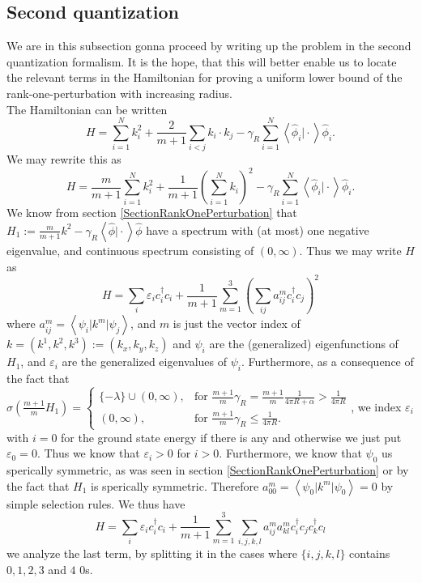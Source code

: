 \documentclass[a4paper,11pt]{article}
\renewcommand{\braket}[1]{\left\langle#1\right\rangle}
\numberwithin{equation}{section}
\begin{document}
\subsection{Second quantization}
We are in this subsection gonna proceed by writing up the problem in the second quantization formalism. It is the hope, that this will better enable us to locate the relevant terms in the Hamiltonian for proving a uniform lower bound of the rank-one-perturbation with increasing radius.\\
The Hamiltonian can be written\begin{equation}
H=\sum_{i=1}^{N}k_i^2+\frac{2}{m+1}\sum_{i<j} k_i\cdot k_j -\gamma_R\sum_{i=1}^{N}\braket{\hat{\phi}_i\vert \cdot}\hat{\phi}_i.
\end{equation}	
We may rewrite this as \begin{equation}
H=\frac{m}{m+1}\sum_{i=1}^{N}k_i^2+\frac{1}{m+1}\left(\sum_{i=1}^{N}k_i\right)^2 -\gamma_R\sum_{i=1}^{N}\braket{\hat{\phi}_i\vert \cdot}\hat{\phi}_i.
\end{equation}
We know from section \ref{SectionRankOnePerturbation} that $ H_1:=\frac{m}{m+1}k^2-\gamma_R\braket{\hat{\phi}\vert \cdot}\hat{\phi} $ have a spectrum with (at most) one negative eigenvalue, and continuous spectrum consisting of $ (0,\infty) $. Thus we may write $ H $ as \begin{equation}
H=\sum_{i} \varepsilon_i c^\dagger_ic_i+\frac{1}{m+1}\sum_{m=1}^{3}\left(\sum_{ij}a^m_{ij}c_i^\dagger c_j\right)^2
\end{equation}
where $ a_{ij}^m=\braket{\psi_i\vert k^m\vert \psi_j} $, and $ m $ is just the vector index of $ k=(k^1,k^2,k^3):=(k_x,k_y,k_z) $ and $ \psi_i $ are the (generalized) eigenfunctions of $ H_1 $, and $ \varepsilon_i $ are the generalized eigenvalues of $ \psi_i $. Furthermore, as a consequence of the fact that $ \sigma(\frac{m+1}{m}H_1)=\begin{cases}
\{-\lambda\}\cup (0,\infty),& \text{for }\frac{m+1}{m}\gamma_R=\frac{m+1}{m}\frac{1}{4\pi R+\alpha}>\frac{1}{4\pi R}\\
(0,\infty),&\text{for }\frac{m+1}{m}\gamma_R\leq\frac{1}{4\pi R}.
\end{cases} $, we index $ \varepsilon_i $ with $ i=0 $ for the ground state energy if there is any and otherwise we just put $ \varepsilon_0=0 $. Thus we know that $ \varepsilon_i>0 $ for $ i>0 $. Furthermore, we know that $ \psi_0 $ us sperically symmetric, as was seen in section \ref{SectionRankOnePerturbation} or by the fact that $ H_1 $ is sperically symmetric. Therefore $ a^m_{00}=\braket{\psi_0\vert k^m\vert \psi_0}=0 $ by simple selection rules. We thus have \begin{equation}
H=\sum_{i} \varepsilon_i c^\dagger_ic_i+\frac{1}{m+1}\sum_{m=1}^{3}\sum_{i,j,k,l}a^m_{ij}a^m_{kl}c_i^\dagger c_jc_k^\dagger c_l
\end{equation}
we analyze the last term, by splitting it in the cases where $ \{i,j,k,l\} $ contains $ 0,1,2,3 $ and $ 4 $ $ 0 $s. 
\end{document}
